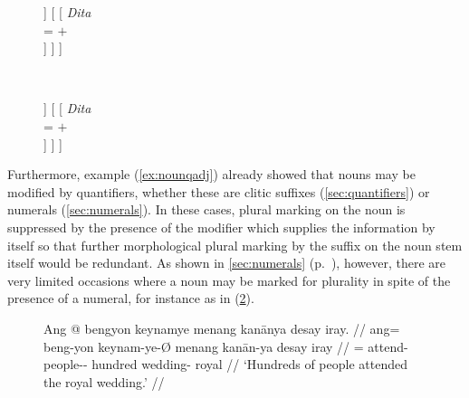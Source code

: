 \begin{figure}
\ex\label{ex:animcaseagrname}
\begin{minipage}[t]{.5\remaining}
\tl\quad\label{ex:animokname} %
\begin{forest}
[\anno{\xhead{N}}
	[\anno{Cl}
		[{%
			\textit{ang} \\
			\ups{\Anim} = $+$ \\
			\ups{\Case} = \Aarg{} \\
		}]
	]
	[
		[{%
			\textit{Dita} \\
			\ups{\Anim} = $+$ \\
		}]
	]
]
\end{forest}
\end{minipage}
~
\begin{minipage}[t]{.5\remaining}
\tl\quad\label{ex:animclashname} %
\ljudge*\begin{forest}
[\anno{\xhead{N}}
	[\anno{Cl}
		[{%
			\textit{eng} \\
			\ups{\Anim} = $-$ \\
			\ups{\Case} = \Aarg{} \\
		}]
	]
	[
		[{%
			\textit{Dita} \\
			\ups{\Anim} = $+$ \\
		}]
	]
]
\end{forest}
\end{minipage}
\xe
\end{figure}

Furthermore, example (\ref{ex:nounqadj}) already showed that nouns may be
modified by quantifiers, whether these are clitic suffixes
(\autoref{sec:quantifiers}) or numerals (\autoref{sec:numerals}). In these
cases, plural marking on the noun is suppressed by the presence of the modifier
which supplies the information by itself so that further morphological plural
marking by the suffix  on the noun stem itself would be
redundant. As shown in \autoref{sec:numerals} (p.~\pageref{hundreds}), however,
there are very limited occasions where a noun may be marked for plurality in
spite of the presence of a numeral, for instance as in (\ref{ex:plovermkg}).

\begin{figure}[h]
\ex\label{ex:plovermkg}\begingl
	\gla Ang @ bengyon keynamye menang kanānya {desay iray}. //
	\glb ang= beng-yon keynam-ye-Ø menang kanān-ya {desay iray} //
	\glc \AgtT{}= attend-\TplN{} people-\Pl{}-\Top{} hundred wedding-\Loc{} 
		royal //
	\glft `Hundreds of people attended the royal wedding.' //
\endgl\xe
\end{figure}

